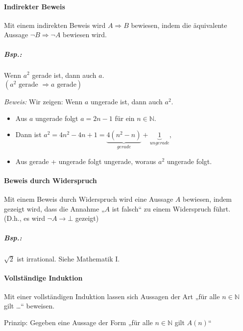 \documentclass{scrreprt}
\begin{document}
\paragraph{Indirekter Beweis} Mit einem indirekten Beweis wird $A\Rightarrow B$ bewiesen, indem die äquivalente Aussage $\neg B \Rightarrow \neg A$ bewiesen wird.

\subparagraph{Bsp.:} Wenn $a^2$ gerade ist, dann auch $a$.\\
$(a^2 \text{ gerade } \Rightarrow a \text{ gerade})$

\emph{Beweis:} Wir zeigen: Wenn $a$ ungerade ist, dann auch $a^2$.
\begin{itemize}
\item Aus $a$ ungerade folgt $a=2n-1$ für ein $n \in \mathbb{N}$. 
\item Dann ist $a^2=4 n^2 - 4 n + 1 = \underbrace{4( n^2-n)}_{gerade} + \underbrace{1}_{ungerade}$, 
\item Aus gerade + ungerade folgt ungerade, woraus $a^2$ ungerade folgt.
\end{itemize}

\paragraph{Beweis durch Widerspruch} Mit einem Beweis durch Widerspruch wird eine Aussage $A$ bewiesen, indem gezeigt wird, dass die Annahme „$A$ ist falsch“ zu einem Widerspruch führt.\\
(D.h., es wird $\neg A \rightarrow \bot$ gezeigt)

\subparagraph{Bsp.:} $\sqrt{2}$ ist irrational. Siehe Mathematik I.

\paragraph{Vollständige Induktion} Mit einer vollständigen Induktion lassen sich Aussagen der Art „für alle $n \in \mathbb{N}$ gilt …“ beweisen.

Prinzip: Gegeben eine Aussage der Form „für alle $n \in \mathbb{N}$ gilt $A(n)$“
\end{document}
